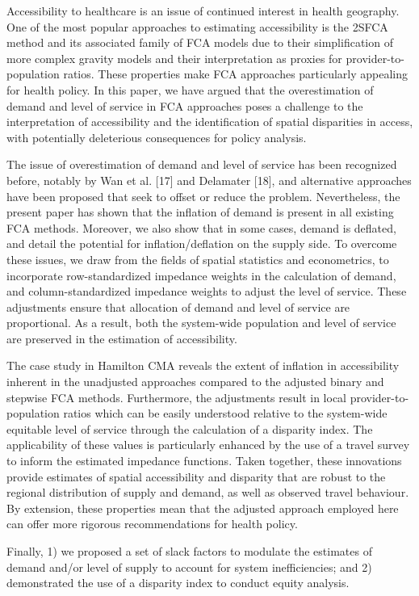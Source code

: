 \documentclass[10pt,letterpaper]{article}
\begin{document}
Accessibility to healthcare is an issue of continued interest in health
geography. One of the most popular approaches to estimating
accessibility is the 2SFCA method and its associated family of FCA
models due to their simplification of more complex gravity models and
their interpretation as proxies for provider-to-population ratios. These
properties make FCA approaches particularly appealing for health policy.
In this paper, we have argued that the overestimation of demand and
level of service in FCA approaches poses a challenge to the
interpretation of accessibility and the identification of spatial
disparities in access, with potentially deleterious consequences for
policy analysis.

The issue of overestimation of demand and level of service has been
recognized before, notably by Wan et al. {[}17{]} and Delamater
{[}18{]}, and alternative approaches have been proposed that seek to
offset or reduce the problem. Nevertheless, the present paper has shown
that the inflation of demand is present in all existing FCA methods.
Moreover, we also show that in some cases, demand is deflated, and
detail the potential for inflation/deflation on the supply side. To
overcome these issues, we draw from the fields of spatial statistics and
econometrics, to incorporate row-standardized impedance weights in the
calculation of demand, and column-standardized impedance weights to
adjust the level of service. These adjustments ensure that allocation of
demand and level of service are proportional. As a result, both the
system-wide population and level of service are preserved in the
estimation of accessibility.

The case study in Hamilton CMA reveals the extent of inflation in
accessibility inherent in the unadjusted approaches compared to the
adjusted binary and stepwise FCA methods. Furthermore, the adjustments
result in local provider-to-population ratios which can be easily
understood relative to the system-wide equitable level of service
through the calculation of a disparity index. The applicability of these
values is particularly enhanced by the use of a travel survey to inform
the estimated impedance functions. Taken together, these innovations
provide estimates of spatial accessibility and disparity that are robust
to the regional distribution of supply and demand, as well as observed
travel behaviour. By extension, these properties mean that the adjusted
approach employed here can offer more rigorous recommendations for
health policy.

Finally, 1) we proposed a set of slack factors to modulate the estimates
of demand and/or level of supply to account for system inefficiencies;
and 2) demonstrated the use of a disparity index to conduct equity
analysis.
\end{document}
